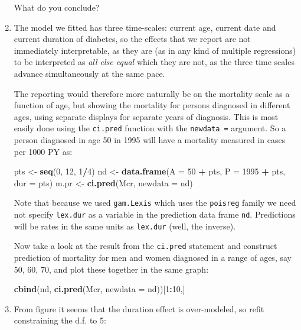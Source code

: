\documentclass[
]{book}
\newenvironment{Shaded}{\begin{snugshade}}{\end{snugshade}}
\newcommand{\AttributeTok}[1]{\textcolor[rgb]{0.13,0.29,0.53}{#1}}
\newcommand{\DecValTok}[1]{\textcolor[rgb]{0.00,0.00,0.81}{#1}}
\newcommand{\FunctionTok}[1]{\textcolor[rgb]{0.13,0.29,0.53}{\textbf{#1}}}
\newcommand{\NormalTok}[1]{#1}
\newcommand{\OtherTok}[1]{\textcolor[rgb]{0.56,0.35,0.01}{#1}}
\newcommand{\SpecialCharTok}[1]{\textcolor[rgb]{0.81,0.36,0.00}{\textbf{#1}}}
\begin{document}
\begin{enumerate}
  What do you conclude?
\item
  The model we fitted has three time-scales: current age, current
  date and current duration of diabetes, so the effects that we report
  are not immediately interpretable, as they are (as in any kind of
  multiple regressions) to be interpreted as \emph{all else equal} which
  they are not, as the three time scales advance simultaneously at the
  same pace.

  The reporting would therefore more naturally be on the
  mortality scale as a function of age, but showing the mortality
  for persons diagnosed in different ages, using separate displays
  for separate years of diagnosis.
  This is most easily done using the \texttt{ci.pred} function with
  the \texttt{newdata\ =} argument. So a person diagnosed in age 50 in
  1995 will have a mortality measured in cases per 1000 PY as:

\begin{Shaded}
\begin{Highlighting}[]
\NormalTok{pts }\OtherTok{\textless{}{-}} \FunctionTok{seq}\NormalTok{(}\DecValTok{0}\NormalTok{, }\DecValTok{12}\NormalTok{, }\DecValTok{1}\SpecialCharTok{/}\DecValTok{4}\NormalTok{)}
\NormalTok{nd }\OtherTok{\textless{}{-}} \FunctionTok{data.frame}\NormalTok{(}\AttributeTok{A =} \DecValTok{50}   \SpecialCharTok{+}\NormalTok{ pts, }
                 \AttributeTok{P =} \DecValTok{1995} \SpecialCharTok{+}\NormalTok{ pts, }
               \AttributeTok{dur =}\NormalTok{        pts)}
\NormalTok{m.pr }\OtherTok{\textless{}{-}} \FunctionTok{ci.pred}\NormalTok{(Mcr, }\AttributeTok{newdata =}\NormalTok{ nd)}
\end{Highlighting}
\end{Shaded}

  Note that because we used \texttt{gam.Lexis} which uses
  the \texttt{poisreg} family we need not specify \texttt{lex.dur} as a
  variable in the prediction data frame \texttt{nd}. Predictions will
  be rates in the same units as \texttt{lex.dur} (well, the inverse).

  Now take a look at the result from the \texttt{ci.pred} statement and
  construct prediction of mortality for men and women diagnosed in a
  range of ages, say 50, 60, 70, and plot these together in the same
  graph:

\begin{Shaded}
\begin{Highlighting}[]
\FunctionTok{cbind}\NormalTok{(nd, }\FunctionTok{ci.pred}\NormalTok{(Mcr, }\AttributeTok{newdata =}\NormalTok{ nd))[}\DecValTok{1}\SpecialCharTok{:}\DecValTok{10}\NormalTok{,]}
\end{Highlighting}
\end{Shaded}
\item
  From figure it seems that the duration effect is
  over-modeled, so refit constraining the d.f. to 5:


\end{enumerate}
\end{document}
